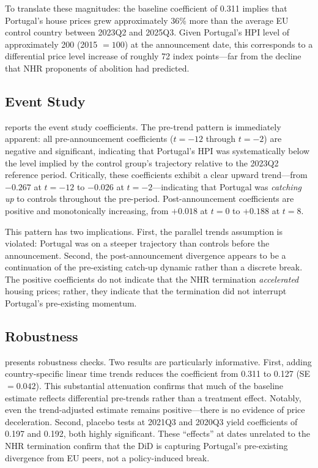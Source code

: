 \documentclass[12pt]{article}
\begin{document}
To translate these magnitudes: the baseline coefficient of 0.311 implies that Portugal's house prices grew approximately 36\% more than the average EU control country between 2023Q2 and 2025Q3. Given Portugal's HPI level of approximately 200 (2015 $= 100$) at the announcement date, this corresponds to a differential price level increase of roughly 72 index points---far from the decline that NHR proponents of abolition had predicted.

\subsection{Event Study}



 reports the event study coefficients. The pre-trend pattern is immediately apparent: all pre-announcement coefficients ($t = -12$ through $t = -2$) are negative and significant, indicating that Portugal's HPI was systematically below the level implied by the control group's trajectory relative to the 2023Q2 reference period. Critically, these coefficients exhibit a clear upward trend---from $-0.267$ at $t = -12$ to $-0.026$ at $t = -2$---indicating that Portugal was \emph{catching up} to controls throughout the pre-period. Post-announcement coefficients are positive and monotonically increasing, from $+0.018$ at $t = 0$ to $+0.188$ at $t = 8$.

This pattern has two implications. First, the parallel trends assumption is violated: Portugal was on a steeper trajectory than controls before the announcement. Second, the post-announcement divergence appears to be a continuation of the pre-existing catch-up dynamic rather than a discrete break. The positive coefficients do not indicate that the NHR termination \emph{accelerated} housing prices; rather, they indicate that the termination did not interrupt Portugal's pre-existing momentum.

\subsection{Robustness}



 presents robustness checks. Two results are particularly informative. First, adding country-specific linear time trends reduces the coefficient from 0.311 to 0.127 (SE $= 0.042$). This substantial attenuation confirms that much of the baseline estimate reflects differential pre-trends rather than a treatment effect. Notably, even the trend-adjusted estimate remains positive---there is no evidence of price deceleration. Second, placebo tests at 2021Q3 and 2020Q3 yield coefficients of 0.197 and 0.192, both highly significant. These ``effects'' at dates unrelated to the NHR termination confirm that the DiD is capturing Portugal's pre-existing divergence from EU peers, not a policy-induced break.
\end{document}
